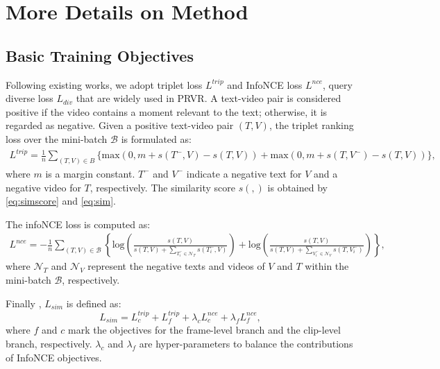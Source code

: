 \section{More Details on Method}
\subsection{Basic Training Objectives}
 Following  existing works\cite{ms-sl,GMMFORMER}, we adopt triplet loss \cite{dong2021dual, faghri2017vse++} $L^{trip}$ and InfoNCE loss \cite{miech2020end, zhang2021video} $L^{nce}$, query diverse loss \cite{GMMFORMER} $L_{div}$ that are widely used in PRVR. A text-video pair is considered positive if the video contains a moment relevant to the text; otherwise, it is regarded as negative.
 Given a positive text-video pair $({T}, {V})$, the triplet ranking loss over the mini-batch $\mathcal{B}$ is formulated as:
\begin{gather}
L^{trip} = \frac{1}{n} \sum_{({T},{V}) \in {B}} \{\text{max}(0, m + s({T}^-, {V}) - s({T}, {V})) \nonumber 
    + \text{max}(0, m + s({T}, {V}^-) - s({T},{V}))\},
\end{gather}
where $m$ is a margin constant. ${T}^-$ and ${V}^-$ indicate a negative text for ${V}$ and a negative video for ${T}$, respectively. The similarity score $s(,)$ is obtained by \cref{eq:simscore} and \cref{eq:sim}.

 The infoNCE loss  is computed as:
\begin{gather}
L^{nce} = -\frac{1}{n} \sum_{({T},{V}) \in \mathcal{B}} \left\{\text{log}\left(\frac{s({T},{V})}{s({T},{V}) + \sum\nolimits_{{T}_i^{-} \in \mathcal{N}_{T} }s({T}_i^-, {V})}\right) \nonumber
+ \text{log}\left(\frac{s({T},{V})}{s({T},{V}) + \sum\nolimits_{{V}_i^{-} \in \mathcal{N}_{V} }s({T}, {V}_i^-)}\right) \right\},
\end{gather}
where $ \mathcal{N}_{T} $ and $ \mathcal{N}_{V} $ represent the negative texts and videos of $ {V} $ and $ {T} $ within the mini-batch $ \mathcal{B} $, respectively.

Finally , $L_{sim}$ is defined as:
\begin{equation}
L_{sim} = L_{c}^{trip} + L_{f}^{trip} + \lambda_c L_{c}^{nce} + \lambda_f L_{f}^{nce},
\end{equation}
where  $f$ and $c$ mark the objectives for the frame-level branch and the  clip-level branch, respectively.
 $\lambda_c$ and $\lambda_f$ are hyper-parameters to balance the contributions of InfoNCE objectives.


